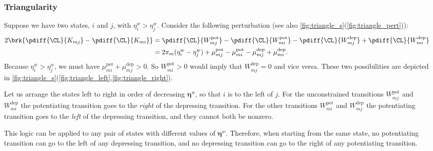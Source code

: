 \documentclass[12pt]{article}
\newcommand{\eqm}{\pi}
\newcommand{\etwm}{\eta^w}
\newcommand{\etw}{\boldsymbol{\eta}^w}
\newcommand{\Wm}{W}
\newcommand{\encm}{K}
\newcommand{\kktm}{\mu}
\newcommand{\pot}{^{\text{pot}}}
\newcommand{\dep}{^{\text{dep}}}
\begin{document}

\subsubsection{Triangularity}\label{sec:parttriangular}

Suppose we have two states, \(i\) and \(j\), with \( \etwm_i > \etwm_j \).
Consider the following perturbation (see also \cref{fig:triangle_s}(\ref{fig:triangle_pert})):
%
\begin{equation}\label{eq:pertKupdn}
\begin{aligned}
  2 \brk{\pdiff{\CL}{\encm_{mj}} - \pdiff{\CL}{\encm_{mi}}}
  &= \pdiff{\CL}{\Wm\pot_{mj}} - \pdiff{\CL}{\Wm\pot_{mi}} -
  \pdiff{\CL}{\Wm\dep_{mj}} + \pdiff{\CL}{\Wm\dep_{mi}} \\ 
    &= 2 \eqm_m (\etwm_i - \etwm_j) 
    + \kktm\pot_{mj} - \kktm\pot_{mi} - \kktm\dep_{mj} + \kktm\dep_{mi}.
\end{aligned}
\end{equation}
%
Because \( \etwm_i > \etwm_j \), we must have \( \kktm\pot_{mi} + \kktm\dep_{mj} > 0 \).
So \( \Wm\pot_{mi} > 0 \) would imply that \( \Wm\dep_{mj} = 0 \) and vice versa.
These two possibilities are depicted in \cref{fig:triangle_s}(\ref{fig:triangle_left},\ref{fig:triangle_right}).

Let us arrange the states left to right in order of decreasing \(\etw\), so that \(i\) is to the left of \(j\).
For the unconstrained transitions \( \Wm\pot_{mj} \) and \( \Wm\dep_{mi} \) the potentiating transition goes to the \emph{right} of the depressing transition.
For the other transitions \( \Wm\pot_{mi} \) and \( \Wm\dep_{mj} \) the potentiating transition goes to the \emph{left} of the depressing transition, and they cannot both be nonzero.

This logic can be applied to any pair of states with different values of \(\etw\).
Therefore, when starting from the same state, no potentiating transition can go to the left of any depressing transition, and no depressing transition can go to the right of any potentiating transition.
\end{document}
